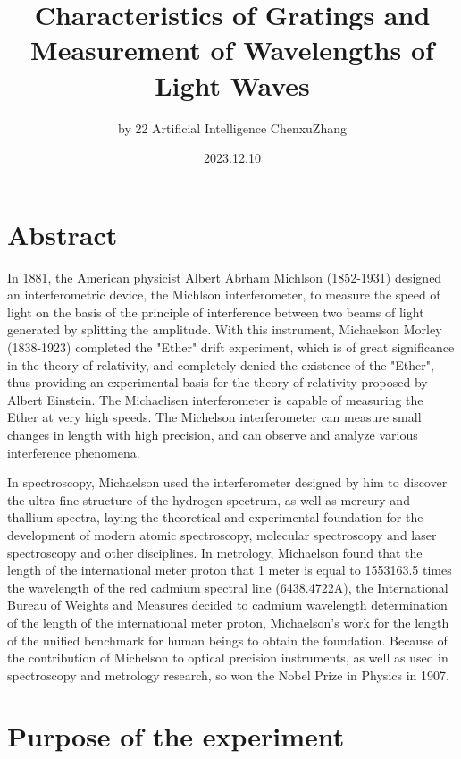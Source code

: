 \documentclass[UTF8]{article}
\title{Characteristics of Gratings and Measurement of Wavelengths of Light Waves}
\author{by 22 Artificial Intelligence ChenxuZhang}
\date{2023.12.10}
\begin{document}
	\fancyfoot[C]{\thepage}
	
	\maketitle
	\tableofcontents
	\newpage
	
	\section{Abstract}
In 1881, the American physicist Albert Abrham Michlson (1852-1931) designed an interferometric device, the Michlson interferometer, to measure the speed of light on the basis of the principle of interference between two beams of light generated by splitting the amplitude. With this instrument, Michaelson Morley (1838-1923) completed the "Ether" drift experiment, which is of great significance in the theory of relativity, and completely denied the existence of the "Ether", thus providing an experimental basis for the theory of relativity proposed by Albert Einstein. The Michaelisen interferometer is capable of measuring the Ether at very high speeds. The Michelson interferometer can measure small changes in length with high precision, and can observe and analyze various interference phenomena.

In spectroscopy, Michaelson used the interferometer designed by him to discover the ultra-fine structure of the hydrogen spectrum, as well as mercury and thallium spectra, laying the theoretical and experimental foundation for the development of modern atomic spectroscopy, molecular spectroscopy and laser spectroscopy and other disciplines. In metrology, Michaelson found that the length of the international meter proton that 1 meter is equal to 1553163.5 times the wavelength of the red cadmium spectral line (6438.4722A), the International Bureau of Weights and Measures decided to cadmium wavelength determination of the length of the international meter proton, Michaelson's work for the length of the unified benchmark for human beings to obtain the foundation. Because of the contribution of Michelson to optical precision instruments, as well as used in spectroscopy and metrology research, so won the Nobel Prize in Physics in 1907.

	\section{Purpose of the experiment}
\end{document}
